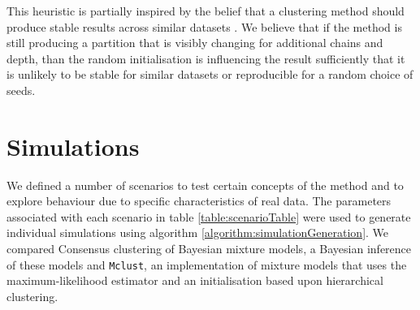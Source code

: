 \documentclass[]{article}
\begin{document}
This heuristic is partially inspired by the belief that a clustering method should produce stable results across similar datasets \citep{von2005towards, meinshausen2010stability}. We believe that if the method is still producing a partition that is visibly changing for additional chains and depth, than the random initialisation is influencing the result sufficiently that it is unlikely to be stable for similar datasets or reproducible for a random choice of seeds. %


\section{Simulations} \label{sec:simulations}
We defined a number of scenarios to test certain concepts of the method and to explore behaviour due to specific characteristics of real data. The parameters associated with each scenario in table \ref{table:scenarioTable} were used to generate individual simulations using algorithm \ref{algorithm:simulationGeneration}. We compared Consensus clustering of Bayesian mixture models, a Bayesian inference of these models and \texttt{Mclust}, an implementation of mixture models that uses the maximum-likelihood estimator and an initialisation based upon hierarchical clustering.
\end{document}
